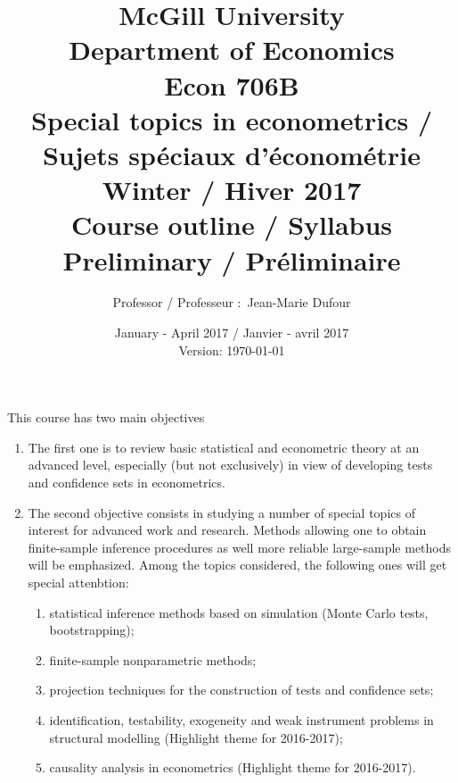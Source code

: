 \documentclass[titlepage,11pt,amstex]{article}
\begin{document}
\title{McGill University\\
Department of Economics\\
Econ 706B\\
Special topics in econometrics / Sujets sp\'{e}ciaux d'\'{e}conom\'{e}trie \\
Winter / Hiver 2017\\
Course outline / Syllabus \\
Preliminary / Pr\'{e}liminaire}
\author{Professor / Professeur :\ Jean-Marie Dufour}
\date{January - April 2017 / Janvier - avril 2017\\
Version: \today }
\maketitle

\setcounter{page}{1}

This course has two main objectives

\begin{enumerate}
\item The first one is to review basic statistical and econometric theory at
an advanced level, especially (but not exclusively) in view of developing
tests and confidence sets in econometrics.

\item The second objective consists in studying a number of special topics
of interest for advanced work and research. Methods allowing one to obtain
finite-sample inference procedures as well more reliable large-sample
methods will be emphasized. Among the topics considered, the following ones
will get special attenbtion:

\begin{enumerate}
\item statistical inference methods based on simulation (Monte Carlo tests,
bootstrapping);

\item finite-sample nonparametric methods;

\item projection techniques for the construction of tests and confidence
sets;

\item identification, testability, exogeneity and weak instrument problems
in structural modelling (Highlight theme for 2016-2017);

\item causality analysis in econometrics (Highlight theme for 2016-2017).
\end{enumerate}
\end{enumerate}
\end{document}
